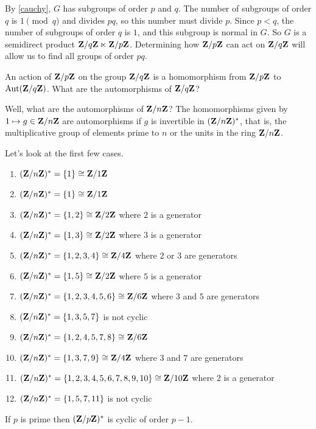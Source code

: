 \documentclass[11pt, oneside]{amsart}
\begin{document}
By \cref{cauchy}, $G$ has subgroups of order $p$ and $q$. The number of subgroups of order $q$ is $1\pmod q$ and divides $pq$, so this number must divide $p$. Since $p<q$, the number of subgroups of order $q$ is $1$, and this subgroup is normal in $G$. So $G$ is a semidirect product $\mathbf Z/q\mathbf Z \ltimes \mathbf Z / p\mathbf Z$. Determining how $\mathbf Z / p\mathbf Z$ can act on $\mathbf Z / q\mathbf Z$ will allow us to find all groups of order $pq$. 

An action of $\mathbf Z / p\mathbf Z$ on the group $\mathbf Z / q\mathbf Z$ is a homomorphism from $\mathbf Z / p\mathbf Z$ to $\operatorname{Aut}(\mathbf Z / q\mathbf Z)$. What are the automorphisms of $\mathbf Z / q\mathbf Z$? 

Well, what are the automorphisms of $\mathbf Z / n\mathbf Z$? The homomorphisms given by $1\mapsto g \in \mathbf Z/n\mathbf Z$ are automorphisms if $g$ is invertible in $(\mathbf Z/n\mathbf Z)^*$, that is, the multiplicative group of elements prime to $n$ or the units in the ring $\mathbf Z/n\mathbf Z$. 

Let's look at the first few cases. 
\begin{enumerate}
\item $(\mathbf Z / n\mathbf Z)^* = \{1\} \cong \mathbf Z/1\mathbf Z$
\item $(\mathbf Z / n\mathbf Z)^* = \{1\} \cong \mathbf Z / 1\mathbf Z$
\item $(\mathbf Z / n\mathbf Z)^* = \{1,2\}\cong \mathbf Z / 2\mathbf Z$ where $2$ is a generator
\item $(\mathbf Z / n\mathbf Z)^* = \{1,3\}\cong \mathbf Z / 2\mathbf Z$ where $3$ is a generator
\item $(\mathbf Z / n\mathbf Z)^* = \{1,2,3,4\}\cong \mathbf Z / 4\mathbf Z$ where $2$ or $3$ are generators
\item $(\mathbf Z / n\mathbf Z)^* = \{1,5\}\cong \mathbf Z / 2\mathbf Z$ where $5$ is a generator
\item $(\mathbf Z / n\mathbf Z)^* = \{1,2,3,4,5,6\}\cong \mathbf Z / 6\mathbf Z$ where $3$ and $5$ are generators
\item $(\mathbf Z / n\mathbf Z)^* = \{1,3,5,7\}$ is not cyclic 
\item $(\mathbf Z / n\mathbf Z)^* = \{1,2,4,5,7,8\}\cong \mathbf Z / 6\mathbf Z$
\item $(\mathbf Z / n\mathbf Z)^* = \{1,3,7,9\}\cong \mathbf Z / 4\mathbf Z$ where $3$ and $7$ are generators
\item $(\mathbf Z / n\mathbf Z)^* = \{1,2,3,4,5,6,7,8,9,10\}\cong \mathbf Z / 10\mathbf Z$ where $2$ is a generator
\item $(\mathbf Z / n\mathbf Z)^* = \{1,5,7, 11\}$ is not cyclic
\end{enumerate}

\begin{proposition}
If $p$ is prime then $(\mathbf Z / p\mathbf Z)^*$ is cyclic of order $p-1$.
\end{proposition}
\end{document}
